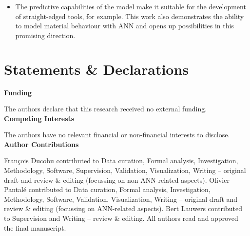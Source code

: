 \documentclass[preprint,12pt,times]{elsarticle}
\begin{document}
\begin{itemize}
  \item The predictive capabilities of the model make it suitable for the development of straight-edged tools, for example. This work also demonstrates the ability to model material behaviour with ANN and opens up possibilities in this promising direction.
\end{itemize}

\section{Statements \& Declarations}

\noindent\textbf{Funding}

\noindent The authors declare that this research received no external funding.\\

\noindent\textbf{Competing Interests}

\noindent The authors have no relevant financial or non-financial interests to disclose.\\

%
%
%
%

\noindent\textbf{Author Contributions}

\noindent François Ducobu contributed to Data curation, Formal analysis, Investigation, Methodology, Software, Supervision, Validation, Visualization, Writing -- original draft and review \& editing (focussing on non ANN-related aspects). Olivier Pantalé contributed to Data curation, Formal analysis, Investigation, Methodology, Software, Validation, Visualization, Writing -- original draft and review \& editing (focussing on ANN-related aspects). Bert Lauwers contributed to Supervision and Writing -- review \& editing. All authors read and approved the final manuscript.

%
%


%
%
%
%
\end{document}
